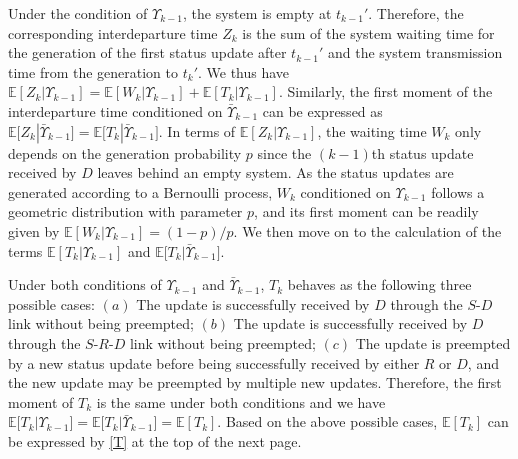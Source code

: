 \documentclass{IEEEtran}
\begin{document}
Under the condition of $\Upsilon_{k-1}$, the system is empty at $t_{k-1}'$. Therefore, the corresponding interdeparture time $Z_k$ is the sum of the system waiting time for the generation of the first status update after $t_{k-1}'$ and the system transmission time from the generation to $t_k'$. We thus have $\mathbb{E}[Z_k|\Upsilon_{k-1}]=\mathbb{E}[W_k|\Upsilon_{k-1}]+\mathbb{E}[T_k|\Upsilon_{k-1}]$. Similarly, the first moment of the interdeparture time conditioned on $\bar{\Upsilon}_{k-1}$ can be expressed as $\mathbb{E}\big[Z_k|\bar{\Upsilon}_{k-1}\big]=\mathbb{E}\big[T_k|\bar{\Upsilon}_{k-1}\big]$. In terms of $\mathbb{E}[Z_k|\Upsilon_{k-1}]$, the waiting time $W_k$ only depends on the generation probability $p$ since the $(k-1)$th status update received by $D$ leaves behind an empty system. As the status updates are generated according to a Bernoulli process, $W_{k}$ conditioned on $\Upsilon_{k-1}$ follows a geometric distribution with parameter $p$, and its first moment can be readily given by $\mathbb{E}[W_k|\Upsilon_{k-1}]=(1-p)/p$. We then move on to the calculation of the terms $\mathbb{E}[T_k|\Upsilon_{k-1}]$ and $\mathbb{E}\big[T_k|\bar{\Upsilon}_{k-1}\big]$.




Under both conditions of $\Upsilon_{k-1}$ and $\bar{\Upsilon}_{k-1}$, $T_k$ behaves as the following three possible cases: $(a)$ The update is successfully received by $D$ through the $S$-$D$ link without being preempted; $(b)$ The update is successfully received by $D$ through the $S$-$R$-$D$ link without being preempted; $(c)$ The update is preempted by a new status update before being successfully received by either $R$ or $D$, and the new update may be preempted by multiple new updates. 
Therefore, the first moment of $T_{k}$ is the same under both conditions and we have $\mathbb{E}[T_k|\Upsilon_{k-1}]=\mathbb{E}\big[T_k|\bar{\Upsilon}_{k-1}\big]=\mathbb{E}[T_k]$. Based on the above possible cases, $\mathbb{E}[T_k]$ can be expressed by \eqref{T} at the top of the next page.
\end{document}

